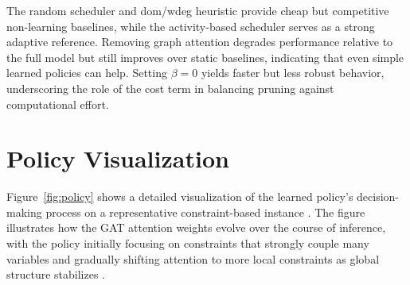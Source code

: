 \documentclass[11pt]{article}
\begin{document}
\begin{table}[t]
  \centering
  \small
  \caption{Additional baselines and ablations on a subset of MiniZinc instances. Random selects dirty constraints uniformly. The dom/wdeg heuristic prioritizes constraints with small domains and high failure counts. Activity-based scheduling uses VSIDS-style activity scores. MetaJuLS without graph attention (w/o GAT) replaces the GAT with a simple MLP over aggregate features, and MetaJuLS with $\beta = 0$ removes the cost term from the reward.}
  \label{tab:ablations}
\end{table}

The random scheduler and dom/wdeg heuristic provide cheap but competitive non-learning baselines, while the activity-based scheduler serves as a strong adaptive reference. Removing graph attention degrades performance relative to the full model but still improves over static baselines, indicating that even simple learned policies can help. Setting $\beta = 0$ yields faster but less robust behavior, underscoring the role of the cost term in balancing pruning against computational effort.

\section{Policy Visualization}
\label{sec:visualization}

Figure~\ref{fig:policy} shows a detailed visualization of the learned policy's decision-making process on a representative constraint-based instance \citep{velickovic2018graph}. The figure illustrates how the GAT attention weights evolve over the course of inference, with the policy initially focusing on constraints that strongly couple many variables and gradually shifting attention to more local constraints as global structure stabilizes \citep{vaswani2017attention,schulman2017proximal}.
\end{document}
